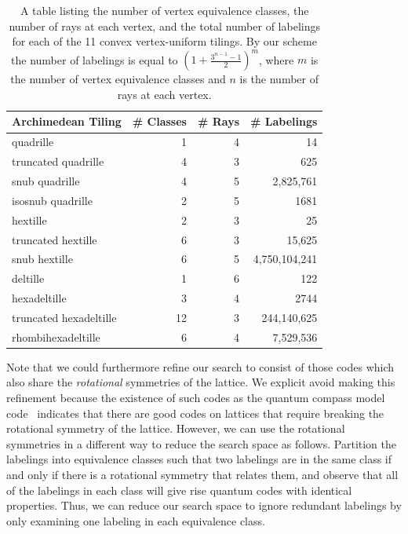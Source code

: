 \documentclass[12pt]{amsbook}
\theoremstyle{plain}
\theoremstyle{definition}
\theoremstyle{remark}
\newcommand{\paren}[1]{\left(#1\right)}
\begin{document}
\begin{table}
\begin{tabular}{lrrr} \toprule
Archimedean Tiling & \# Classes & \# Rays & \# Labelings \\ \midrule
quadrille & 1 & 4 & 14\\
truncated quadrille & 4 & 3 & 625\\
snub quadrille & 4 & 5 & 2,825,761\\
isosnub quadrille & 2 & 5 & 1681\\
hextille & 2 & 3 & 25\\
truncated hextille & 6 & 3 & 15,625\\
snub hextille & 6 & 5 & 4,750,104,241\\
deltille & 1 & 6 & 122\\
hexadeltille & 3 & 4 & 2744\\
truncated hexadeltille & 12 & 3 & 244,140,625\\
rhombihexadeltille & 6 & 4 & 7,529,536\\ \bottomrule
\end{tabular}
\caption[Combinatorics of the tilings]{
\label{table:combinatorics}
A table listing the number of vertex equivalence classes, the number of rays at each vertex, and the total number of labelings for each of the 11 convex vertex-uniform tilings.  By our scheme the number of labelings is equal to $\paren{1+\frac{3^{n-1}-1}{2}}^m$, where $m$ is the number of vertex equivalence classes and $n$ is the number of rays at each vertex.}
\end{table}

Note that we could furthermore refine our search to consist of those codes which also share the \emph{rotational} symmetries of the lattice.  We explicit avoid making this refinement because the existence of such codes as the quantum compass model code~\cite{Bacon:06a} indicates that there are good codes on lattices that require breaking the rotational symmetry of the lattice.  However, we can use the rotational symmetries in a different way to reduce the search space as follows.  Partition the labelings into equivalence classes such that two labelings are in the same class if and only if there is a rotational symmetry that relates them, and observe that all of the labelings in each class will give rise quantum codes with identical properties.  Thus, we can reduce our search space to ignore redundant labelings by only examining one labeling in each equivalence class.
\end{document}
